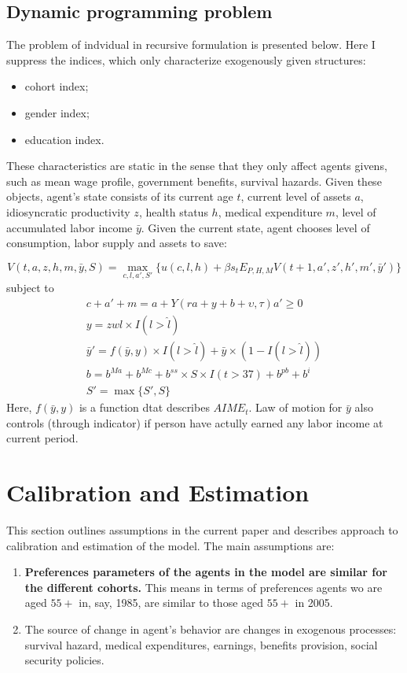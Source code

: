 \documentclass[
10pt, %
a4paper, %
oneside, %
headinclude,footinclude, %
BCOR5mm, %
]{scrartcl}
\begin{document}
\subsection{Dynamic programming problem}
The problem of indvidual in recursive formulation is presented below. Here I suppress the indices, which only characterize exogenously given structures:
\begin{itemize}
\item cohort index;
\item gender index;
\item education index.
\end{itemize}
These characteristics are static in the sense that they only affect agents givens, such as mean wage profile, government benefits, survival hazards. Given these objects, agent's state consists of its current age $t$, current level of assets $a$, idiosyncratic productivity $z$, health status $h$, medical expenditure $m$, level of accumulated labor income $\bar{y}$. Given the current state, agent chooses level of consumption, labor supply and assets to save:

\begin{equation}
V(t,a,z,h,m,\bar{y},S) = \max_{c,l,a',S'}\{u(c,l,h) + \beta s_t  E_{P,H,M} V(t+1,a',z',h',m',\bar{y}')\}
\end{equation}
subject to 
\begin{eqnarray*}
c + a' +m = a+Y(ra+y+b+\upsilon,\tau)
a'\ge0 \\
y = z w l \times I(l>\hat{l}) \\
\bar{y}' = f(\bar{y},y)\times I(l>\hat{l}) + \bar{y}\times (1-I(l>\hat{l})) \\
b = b^{Ma}+b^{Mc} + b^{ss}\times S\times I(t>37)+b^{pb}+b^{i} \\
S' = \max\{S',S\}
\end{eqnarray*}
Here, $f(\bar{y},y)$ is a function dtat describes $AIME_t$.
Law of motion for $\bar{y}$ also controls (through indicator) if person have actully earned any labor income at current period.

\section{Calibration and Estimation}
This section outlines assumptions in the current paper and describes approach to calibration and estimation of the model.
The main assumptions are:
\begin{enumerate}
\item \textbf{Preferences parameters of the agents in the model are similar for the different cohorts.} This means in terms of preferences agents wo are aged $55+$ in, say, 1985, are similar to those aged $55+$ in 2005.
\item The source of change in agent's behavior are changes in exogenous processes: survival hazard, medical expenditures, earnings, benefits provision, social security policies. 
\end{enumerate}
\end{document}
